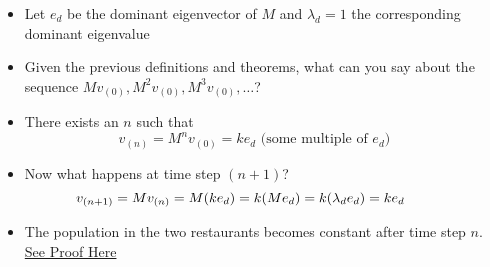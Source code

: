 \begin{frame}
  \begin{columns}
    \begin{overlayarea}{\textwidth}{\textheight}
        \begin{itemize}\justifying
          \item<1-> Let $e_d$ be the dominant eigenvector of $M$ and $\lambda_d = 1$ the corresponding dominant eigenvalue
          \item<2-> Given the previous definitions and theorems, what can
                you say about the sequence $Mv_{(0)}, M^2v_{(0)}, M^3v_{(0)}, \dots $?
          \item<3-> There exists an $n$ such that
                \begin{equation*}
                  v_{(n)} = M^nv_{(0)} = ke_d \text{ (some multiple of $e_d$)}
                \end{equation*}
          \item<4-> Now what happens at time step $(n+1)$?
                \begin{equation*}
                  \hspace{-0.28in}
                  v_{(n+1)} = Mv_{(n)} = M(ke_d) = k(Me_d) = k(\lambda_d e_d) = ke_d
                \end{equation*}
          \item<5-> The population in the two restaurants becomes constant after
                time step $n$. \\
                \href{https://www.quora.com/Why-does-repeatedly-multiplying-a-vector-by-a-square-matrix-cause-the-vector-to-converge-on-or-along-the-matrixs-eigenvector}{See Proof Here}
        \end{itemize}
    \end{overlayarea}

    \begin{overlayarea}{\textwidth}{\textheight}
    \begin{center}
      
    \end{center}
    \end{overlayarea}
  \end{columns}
\end{frame}

